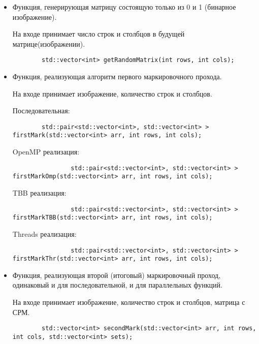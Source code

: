 \documentclass{report}
\begin{document}
		\begin{itemize}
			\item Функция, генерирующая матрицу состоящую только из 0 и 1 (бинарное изображение).
			\par На входе принимает число строк и столбцов в будущей матрице(изображении). 
			\begin{lstlisting}
		std::vector<int> getRandomMatrix(int rows, int cols);
			\end{lstlisting}

			\item Функция, реализующая алгоритм первого маркировочного прохода.
			\par На входе принимает изображение, количество строк и столбцов.
			\par Последовательная:
			\begin{lstlisting}
		std::pair<std::vector<int>, std::vector<int> > firstMark(std::vector<int> arr, int rows, int cols);
			\end{lstlisting}
		    \par OpenMP реализация:
		    \begin{lstlisting}
		    	std::pair<std::vector<int>, std::vector<int> > firstMarkOmp(std::vector<int> arr, int rows, int cols);
		    \end{lstlisting}
		    \par TBB реализация:
		    \begin{lstlisting}
		    	std::pair<std::vector<int>, std::vector<int> > firstMarkTBB(std::vector<int> arr, int rows, int cols);
		    \end{lstlisting}
		    \par Threads реализация:
		    \begin{lstlisting}
		    	std::pair<std::vector<int>, std::vector<int> > firstMarkThr(std::vector<int> arr, int rows, int cols);
		    \end{lstlisting}

			\item Функция, реализующая второй (итоговый) маркировочный проход, одинаковый и для последовательной, и для параллельных функций.
			\par На входе принимает изображение, количество строк и столбцов, матрица с СРМ.
			\begin{lstlisting}
		std::vector<int> secondMark(std::vector<int> arr, int rows, int cols, std::vector<int> sets);
			\end{lstlisting}


\end{itemize}
\end{document}
